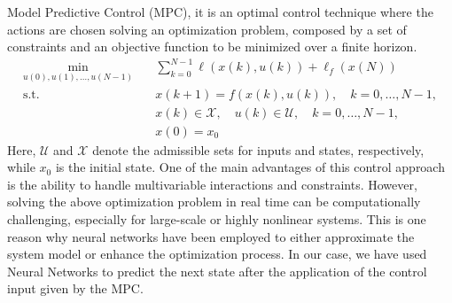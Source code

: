 Model Predictive Control (MPC), it is an optimal control technique where the actions are chosen solving an optimization problem, composed by a set of constraints and an
objective function to be minimized over a finite horizon.
\begin{align}
    \min_{u(0), u(1), \dots, u(N-1)} \quad & \sum_{k=0}^{N-1} \ell(x(k), u(k)) + \ell_f(x(N)) \\
    \text{s.t.} \quad & x(k+1) = f(x(k), u(k)), \quad k = 0, \dots, N-1, \\
    & x(k) \in \mathcal{X}, \quad u(k) \in \mathcal{U}, \quad k = 0, \dots, N-1, \\
    & x(0) = x_{\text{0}}
\end{align}
Here, $\mathcal{U}$ and $\mathcal{X}$ denote the admissible sets for inputs and states, respectively, while $x_{\text{0}}$ is the initial state.
One of the main advantages of this control approach is the ability to handle multivariable interactions and constraints. However, solving the above optimization problem in real time can be computationally challenging, especially for large-scale or highly nonlinear systems. This is one reason why neural networks have been employed to either approximate the system model or enhance the optimization process. In our case, we have used Neural Networks to predict the next state after the application of the control input given by the MPC.

